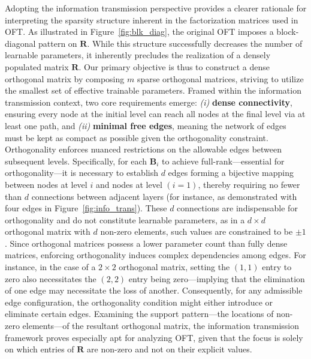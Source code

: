 Adopting the information transmission perspective provides a clearer rationale for interpreting the sparsity structure inherent in the factorization matrices used in OFT. As illustrated in Figure~\ref{fig:blk_diag}, the original OFT imposes a block-diagonal pattern on $\bm{R}$. While this structure successfully decreases the number of learnable parameters, it inherently precludes the realization of a densely populated matrix $\bm{R}$. Our primary objective is thus to construct a dense orthogonal matrix by composing $m$ sparse orthogonal matrices, striving to utilize the smallest set of effective trainable parameters. Framed within the information transmission context, two core requirements emerge: \emph{(i)} \textbf{dense connectivity}, ensuring every node at the initial level can reach all nodes at the final level via at least one path, and \emph{(ii)} \textbf{minimal free edges}, meaning the network of edges must be kept as compact as possible given the orthogonality constraint. Orthogonality enforces nuanced restrictions on the allowable edges between subsequent levels. Specifically, for each $\bm{B}_i$ to achieve full-rank—essential for orthogonality—it is necessary to establish $d$ edges forming a bijective mapping between nodes at level $i$ and nodes at level $(i=1)$, thereby requiring no fewer than $d$ connections between adjacent layers (for instance, as demonstrated with four edges in Figure~\ref{fig:info_trans}). These $d$ connections are indispensable for orthogonality and do not constitute learnable parameters, as in a $d\times d$ orthogonal matrix with $d$ non-zero elements, such values are constrained to be $\pm 1$. Since orthogonal matrices possess a lower parameter count than fully dense matrices, enforcing orthogonality induces complex dependencies among edges. For instance, in the case of a $2\times 2$ orthogonal matrix, setting the $(1,1)$ entry to zero also necessitates the $(2,2)$ entry being zero—implying that the elimination of one edge may necessitate the loss of another. Consequently, for any admissible edge configuration, the orthogonality condition might either introduce or eliminate certain edges. Examining the support pattern—the locations of non-zero elements—of the resultant orthogonal matrix, the information transmission framework proves especially apt for analyzing OFT, given that the focus is solely on which entries of $\bm{R}$ are non-zero and not on their explicit values.

